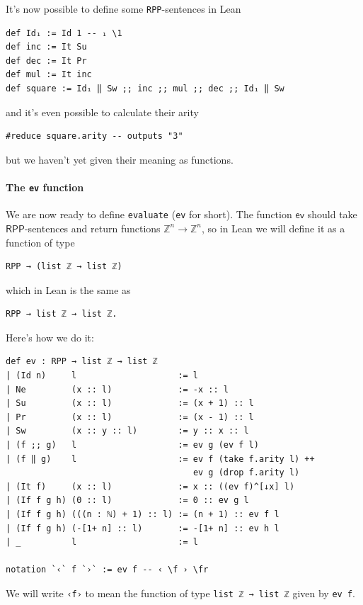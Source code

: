 \documentclass{book}
\theoremstyle{definition}
\theoremstyle{remark}
\theoremstyle{plain}
\newcommand{\ZZ}{\mathbb{Z}}
\newcommand{\RPP}{\mathsf{RPP}}
\begin{document}
It's now possible to define some \lstinline{RPP}-sentences in Lean
\begin{lstlisting}
def Id₁ := Id 1 -- ₁ \1
def inc := It Su
def dec := It Pr
def mul := It inc
def square := Id₁ ‖ Sw ;; inc ;; mul ;; dec ;; Id₁ ‖ Sw
\end{lstlisting}
and it's even possible to calculate their arity
\begin{lstlisting}
#reduce square.arity -- outputs "3"
\end{lstlisting}
but we haven't yet given their meaning as functions.

\paragraph{The \lstinline{ev} function}
We are now ready to define \lstinline{evaluate} (\lstinline{ev} for short).
The function $\mathsf{ev}$ should take $\RPP$-sentences and return functions $\ZZ^n \to \ZZ^n$,
so in Lean we will define it as a function of type
\begin{lstlisting}
RPP → (list ℤ → list ℤ)
\end{lstlisting}
which in Lean is the same as
\begin{lstlisting}
RPP → list ℤ → list ℤ.
\end{lstlisting}
Here's how we do it:
\begin{lstlisting}
def ev : RPP → list ℤ → list ℤ
| (Id n)     l                    := l
| Ne         (x :: l)             := -x :: l
| Su         (x :: l)             := (x + 1) :: l
| Pr         (x :: l)             := (x - 1) :: l
| Sw         (x :: y :: l)        := y :: x :: l
| (f ;; g)   l                    := ev g (ev f l)
| (f ‖ g)    l                    := ev f (take f.arity l) ++
                                     ev g (drop f.arity l)
| (It f)     (x :: l)             := x :: ((ev f)^[↓x] l)
| (If f g h) (0 :: l)             := 0 :: ev g l
| (If f g h) (((n : ℕ) + 1) :: l) := (n + 1) :: ev f l
| (If f g h) (-[1+ n] :: l)       := -[1+ n] :: ev h l
| _          l                    := l

notation `‹` f `›` := ev f -- ‹ \f › \fr
\end{lstlisting}
We will write \lstinline{‹f›} to mean the function of type \lstinline{list ℤ → list ℤ} given by \lstinline{ev f}.
\end{document}
